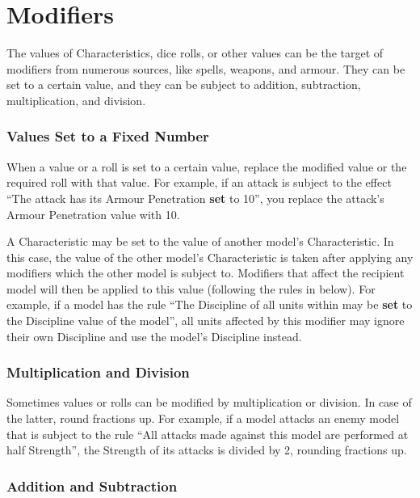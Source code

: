 
\part{Modifiers}
\label{modifiers}

The values of Characteristics, dice rolls, or other values can be the target of modifiers from numerous sources, like spells, weapons, and armour. They can be set to a certain value, and they can be subject to addition, subtraction, multiplication, and division.

\section{Values Set to a Fixed Number}
\label{values_set_to_a_fixed_number}

When a value or a roll is set to a certain value, replace the modified value or the required roll with that value. For example, if an attack is subject to the effect \enquote{The attack has its Armour Penetration \textbf{set} to 10}, you replace the attack's Armour Penetration value with 10.

A Characteristic may be set to the value of another model's Characteristic. In this case, the value of the other model's Characteristic is taken after applying any modifiers which the other model is subject to. Modifiers that affect the recipient model will then be applied to this value (following the rules in  below). For example, if a model has the rule \enquote{The Discipline of all units within  may be \textbf{set} to the Discipline value of the model}, all units affected by this modifier may ignore their own Discipline and use the model's Discipline instead.

\section{Multiplication and Division}
\label{multiplication_and_division}

Sometimes values or rolls can be modified by multiplication or division. In case of the latter, round fractions up. For example, if a model attacks an enemy model that is subject to the rule \enquote{All attacks made against this model are performed at half Strength}, the Strength of its attacks is divided by 2, rounding fractions up.

\section{Addition and Subtraction}
\label{addition_and_subtraction}

